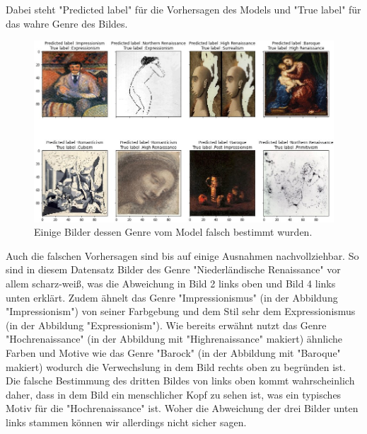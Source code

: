 Dabei steht "Predicted label" für die Vorhersagen des Models und "True label" für das wahre Genre des Bildes.
\begin{figure}
    \centering
    \includegraphics[width=\textwidth]{content/data/errors.JPG}
    \caption{Einige Bilder dessen Genre vom Model falsch bestimmt wurden.}
    \label{fig:fehler}
\end{figure}
Auch die falschen Vorhersagen sind bis auf einige Ausnahmen nachvollziehbar.
So sind in diesem Datensatz Bilder des Genre "Niederländische Renaissance" vor allem scharz-weiß, was die Abweichung in Bild 2 links oben und Bild 4 links unten erklärt.
Zudem ähnelt das Genre "Impressionismus" (in der Abbildung "Impressionism") von seiner Farbgebung und dem Stil sehr dem Expressionismus (in der Abbildung "Expressionism").
Wie bereits erwähnt nutzt das Genre "Hochrenaissance" (in der Abbildung mit "Highrenaissance" makiert) ähnliche Farben und Motive wie das Genre "Barock" (in der Abbildung mit "Baroque" makiert) wodurch die Verwechslung in dem Bild rechts oben zu begründen ist.
Die falsche Bestimmung des dritten Bildes von links oben kommt wahrscheinlich daher, dass in dem Bild ein menschlicher Kopf zu sehen ist, was ein typisches Motiv für die "Hochrenaissance" ist.
Woher die Abweichung der drei Bilder unten links stammen können wir allerdings nicht sicher sagen.